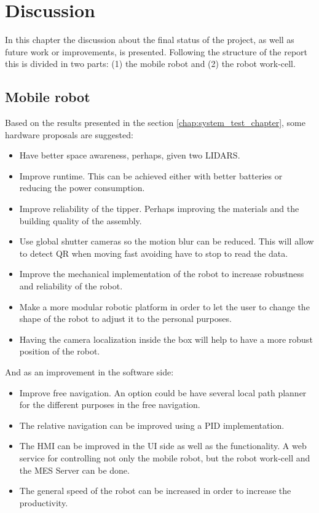 \chapter{Discussion}
\label{chap:discussion}
In this chapter the discussion about the final status of the project, as well as future work or improvements, is presented.
Following the structure of the report this is divided in two parts: (1) the mobile robot and (2) the robot work-cell.

	\section{Mobile robot} %
	\label{sub:mobile_robot}
	Based on the results presented in the section \ref{chap:system_test_chapter}, some hardware proposals are suggested:
	\begin{itemize}
		\item Have better space awareness, perhaps, given two LIDARS.
		\item Improve runtime. This can be achieved either with better batteries or reducing the power consumption.
		\item Improve reliability of the tipper. Perhaps improving the materials and the building quality of the assembly.
		\item Use global shutter cameras so the motion blur can be reduced. This will allow to detect QR when moving fast avoiding have to stop to read the data.
		\item Improve the mechanical implementation of the robot to increase robustness and reliability of the robot.
		\item Make a more modular robotic platform in order to let the user to change the shape of the robot to adjust it to the personal purposes.
		\item Having the camera localization inside the box will help to have a more robust position of the robot.
	\end{itemize}
	And as an improvement in the software side:
	\begin{itemize}
		\item Improve free navigation. An option could be have several local path planner for the different purposes in the free navigation.
		\item The relative navigation can be improved using a PID implementation.
		\item The HMI can be improved in the UI side as well as the functionality. A web service for controlling not only the mobile robot, but the robot work-cell and the MES Server can be done.
		\item The general speed of the robot can be increased in order to increase the productivity.
	\end{itemize}

